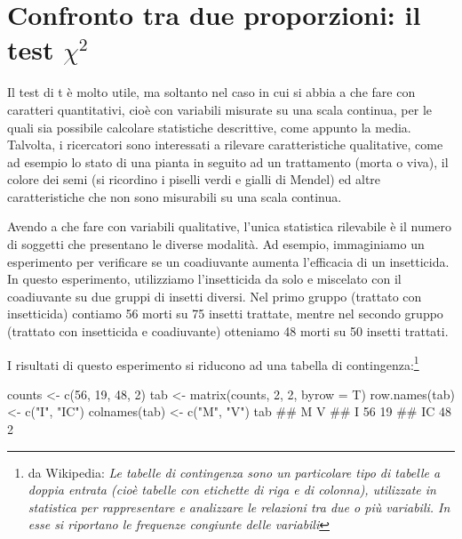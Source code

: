 \documentclass[a4paper,12pt,oneside]{book}
\newenvironment{Shaded}{}{}
\newcommand{\KeywordTok}[1]{#1}
\newcommand{\DataTypeTok}[1]{#1}
\newcommand{\DecValTok}[1]{#1}
\newcommand{\StringTok}[1]{#1}
\newcommand{\CommentTok}[1]{#1}
\newcommand{\NormalTok}[1]{#1}
\begin{document}
\hypertarget{confronto-tra-due-proporzioni-il-test-chi2}{%
\section{\texorpdfstring{Confronto tra due proporzioni: il test \(\chi^2\)}{Confronto tra due proporzioni: il test \textbackslash{}chi\^{}2}}\label{confronto-tra-due-proporzioni-il-test-chi2}}

Il test di t è molto utile, ma soltanto nel caso in cui si abbia a che fare con caratteri quantitativi, cioè con variabili misurate su una scala continua, per le quali sia possibile calcolare statistiche descrittive, come appunto la media. Talvolta, i ricercatori sono interessati a rilevare caratteristiche qualitative, come ad esempio lo stato di una pianta in seguito ad un trattamento (morta o viva), il colore dei semi (si ricordino i piselli verdi e gialli di Mendel) ed altre caratteristiche che non sono misurabili su una scala continua.

Avendo a che fare con variabili qualitative, l'unica statistica rilevabile è il numero di soggetti che presentano le diverse modalità. Ad esempio, immaginiamo un esperimento per verificare se un coadiuvante aumenta l'efficacia di un insetticida. In questo esperimento, utilizziamo l'insetticida da solo e miscelato con il coadiuvante su due gruppi di insetti diversi. Nel primo gruppo (trattato con insetticida) contiamo 56 morti su 75 insetti trattate, mentre nel secondo gruppo (trattato con insetticida e coadiuvante) otteniamo 48 morti su 50 insetti trattati.

I risultati di questo esperimento si riducono ad una tabella di contingenza:\footnote{da Wikipedia: \emph{Le tabelle di contingenza sono un particolare tipo di tabelle a doppia entrata (cioè tabelle con etichette di riga e di colonna), utilizzate in statistica per rappresentare e analizzare le relazioni tra due o più variabili. In esse si riportano le frequenze congiunte delle variabili}}

\begin{Shaded}
\begin{Highlighting}[]
\NormalTok{counts <-}\StringTok{ }\KeywordTok{c}\NormalTok{(}\DecValTok{56}\NormalTok{, }\DecValTok{19}\NormalTok{, }\DecValTok{48}\NormalTok{, }\DecValTok{2}\NormalTok{)}
\NormalTok{tab <-}\StringTok{ }\KeywordTok{matrix}\NormalTok{(counts, }\DecValTok{2}\NormalTok{, }\DecValTok{2}\NormalTok{, }\DataTypeTok{byrow =}\NormalTok{ T)}
\KeywordTok{row.names}\NormalTok{(tab) <-}\StringTok{ }\KeywordTok{c}\NormalTok{(}\StringTok{"I"}\NormalTok{, }\StringTok{"IC"}\NormalTok{)}
\KeywordTok{colnames}\NormalTok{(tab) <-}\StringTok{ }\KeywordTok{c}\NormalTok{(}\StringTok{"M"}\NormalTok{, }\StringTok{"V"}\NormalTok{)}
\NormalTok{tab}
\CommentTok{##     M  V}
\CommentTok{## I  56 19}
\CommentTok{## IC 48  2}
\end{Highlighting}
\end{Shaded}
\end{document}
